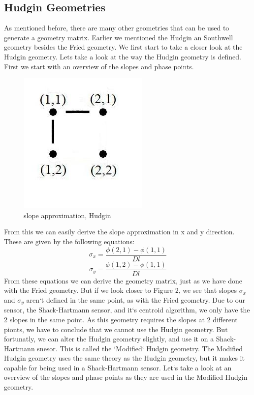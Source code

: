 \documentclass{article}
\begin{document}
\subsection{Hudgin Geometries}
As mentioned before, there are many other geometries that can be used to generate a geometry matrix. Earlier we mentioned the Hudgin an Southwell geometry besides the Fried geometry. We first start to take a closer look at the Hudgin geometry.
\newline
\newline
Lets take a look at the way the Hudgin geometry is defined. First we start with an overview of the slopes and phase points.
\begin{figure}[h!]
  \centering
  \includegraphics[scale=0.6]{figures/hudgin}
  \caption{slope approximation, Hudgin}
\end{figure}
From this we can easily derive the slope approximation in x and y direction. These are given by the following equations:
$$ \sigma_x = \frac{\phi(2,1)-\phi(1,1)}{Dl}$$
$$ \sigma_y = \frac{\phi(1,2)-\phi(1,1)}{Dl}$$
From these equations we can derive the geometry matrix, just as we have done with the Fried geometry. But if we look closer to Figure 2, we see that slopes $\sigma_x$ and $\sigma_y$ aren`t defined in the same point, as with the Fried geometry. Due to our sensor, the Shack-Hartmann sensor, and it`s centroid algorithm, we only have the 2 slopes in the same point. As this geometry requires the slopes at 2 different pionts, we have to conclude that we cannot use the Hudgin geometry. But fortunatly, we can alter the Hudgin geometry slightly, and use it on a Shack-Hartmann snesor. This is called the `Modified` Hudgin geometry.
\newline
\newline
The Modified Hudgin geometry uses the same theory as the Hudgin geometry, but it makes it capable for being used in a Shack-Hartmann sensor. Let`s take a look at an overview of the slopes and phase points as they are used in the Modified Hudgin geometry.  
\end{document}
